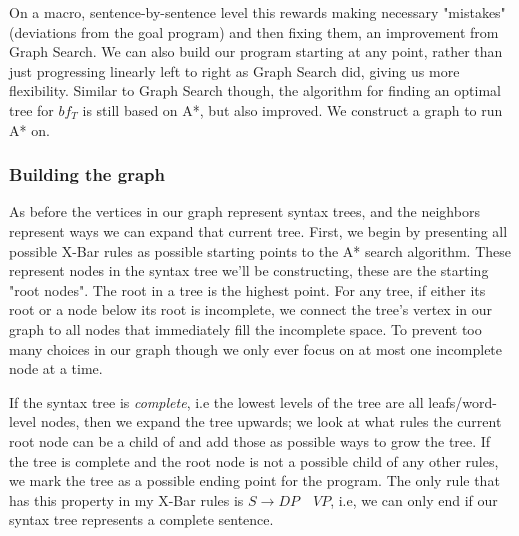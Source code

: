 \documentclass[runningheads]{llncs}
\begin{document}
On a macro, sentence-by-sentence level this rewards making necessary "mistakes" (deviations from the goal program) and then fixing them, an improvement from Graph Search. We can also build our program starting at any point, rather than just progressing linearly left to right as Graph Search did, giving us more flexibility. Similar to Graph Search though, the algorithm for finding an optimal tree for $bf_{T}$ is still based on A*, but also improved. We construct a graph to run A* on.

\subsubsection*{Building the graph}
As before the vertices in our graph represent syntax trees, and the neighbors represent ways we can expand that current tree. First, we begin by presenting all possible X-Bar rules as possible starting points to the A* search algorithm. These represent nodes in the syntax tree we'll be constructing, these are the starting "root nodes". The root in a tree is the highest point. For any tree, if either its root or a node below its root is incomplete, we connect the tree's vertex in our graph to all nodes that immediately fill the incomplete space. To prevent too many choices in our graph though we only ever focus on at most one incomplete node at a time.

If the syntax tree is \textit{complete}, i.e the lowest levels of the tree are all leafs/word-level nodes, then we expand the tree upwards; we look at what rules the current root node can be a child of and add those as possible ways to grow the tree. If the tree is complete and the root node is not a possible child of any other rules, we mark the tree as a possible ending point for the program. The only rule that has this property in my X-Bar rules is $S \rightarrow DP \quad VP$, i.e, we can only end if our syntax tree represents a complete sentence.
\end{document}
